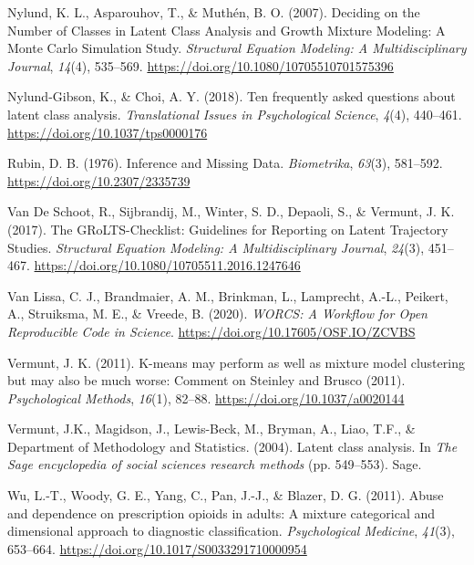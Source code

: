 \documentclass[
  ,man]{apa6}
\newlength{\cslhangindent}
\newlength{\cslentryspacingunit} %
\newenvironment{CSLReferences}[2] %
 {%
  \setlength{\parindent}{0pt}
  \ifodd #1
  \let\oldpar\par
  \def\par{\hangindent=\cslhangindent\oldpar}
  \fi
  \setlength{\parskip}{#2\cslentryspacingunit}
 }%
 {}
\begin{document}
\begin{CSLReferences}{1}{0}
\leavevmode{}%
Nylund, K. L., Asparouhov, T., \& Muthén, B. O. (2007). Deciding on the {Number} of {Classes} in {Latent Class Analysis} and {Growth Mixture Modeling}: {A Monte Carlo Simulation Study}. \emph{Structural Equation Modeling: A Multidisciplinary Journal}, \emph{14}(4), 535--569. \url{https://doi.org/10.1080/10705510701575396}

\leavevmode{}%
Nylund-Gibson, K., \& Choi, A. Y. (2018). Ten frequently asked questions about latent class analysis. \emph{Translational Issues in Psychological Science}, \emph{4}(4), 440--461. \url{https://doi.org/10.1037/tps0000176}

\leavevmode{}%
Rubin, D. B. (1976). Inference and {Missing Data}. \emph{Biometrika}, \emph{63}(3), 581--592. \url{https://doi.org/10.2307/2335739}

\leavevmode{}%
Van De Schoot, R., Sijbrandij, M., Winter, S. D., Depaoli, S., \& Vermunt, J. K. (2017). The {GRoLTS-Checklist}: {Guidelines} for {Reporting} on {Latent Trajectory Studies}. \emph{Structural Equation Modeling: A Multidisciplinary Journal}, \emph{24}(3), 451--467. \url{https://doi.org/10.1080/10705511.2016.1247646}

\leavevmode{}%
Van Lissa, C. J., Brandmaier, A. M., Brinkman, L., Lamprecht, A.-L., Peikert, A., Struiksma, M. E., \& Vreede, B. (2020). \emph{{WORCS}: {A Workflow} for {Open Reproducible Code} in {Science}}. \url{https://doi.org/10.17605/OSF.IO/ZCVBS}

\leavevmode{}%
Vermunt, J. K. (2011). K-means may perform as well as mixture model clustering but may also be much worse: {Comment} on {Steinley} and {Brusco} (2011). \emph{Psychological Methods}, \emph{16}(1), 82--88. \url{https://doi.org/10.1037/a0020144}

\leavevmode{}%
Vermunt, J.K., Magidson, J., Lewis-Beck, M., Bryman, A., Liao, T.F., \& Department of Methodology and Statistics. (2004). Latent class analysis. In \emph{The {Sage} encyclopedia of social sciences research methods} (pp. 549--553). {Sage}.

\leavevmode{}%
Wu, L.-T., Woody, G. E., Yang, C., Pan, J.-J., \& Blazer, D. G. (2011). Abuse and dependence on prescription opioids in adults: A mixture categorical and dimensional approach to diagnostic classification. \emph{Psychological Medicine}, \emph{41}(3), 653--664. \url{https://doi.org/10.1017/S0033291710000954}

\end{CSLReferences}
\end{document}
